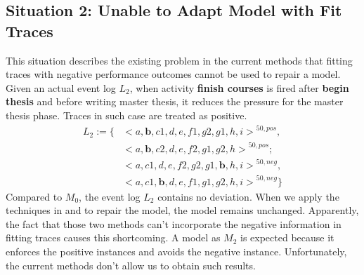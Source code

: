 \subsection{Situation 2: \small{Unable to Adapt Model with Fit Traces}}
This situation describes the existing problem in the current methods that fitting traces with negative performance outcomes cannot be used to repair a model. Given an actual event log $L_2$, when activity \textbf{finish courses} is fired after \textbf{begin thesis} and before writing master thesis, it reduces the pressure for the master thesis phase. Traces in such case are treated as positive.
\begin{align*}
L_2:=\{ & { <a,\textbf{b},c1,d,e,f1,g2,g1,h,i>}^{50, pos} , \\   &{<a,\textbf{b},c2,d,e,f2,g1,g2,h>}^{50, pos};   \\
& {<a,c1,d,e,f2,g2,g1,\textbf{b},h,i>}^{50, neg} , \\
& {<a,c1,\textbf{b},d,e,f1,g1,g2,h,i>}^{50, neg}  \}
\end{align*}
Compared to $M_0$, the event log $L_2$ contains no deviation. When we apply the techniques in  \cite{fahland2015model} and  \cite{dees2017enhancing} to repair the model, the model remains unchanged. Apparently, the fact that those two methods can't incorporate the negative information in fitting traces causes this shortcoming. A model as $M_2$ is expected because it enforces the positive instances and avoids the negative instance. Unfortunately, the current methods don't allow us to obtain such results. 
